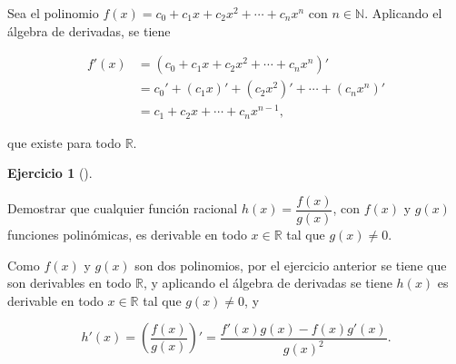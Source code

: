 \documentclass[
  spanish,
  a4paper,
]{scrreport}
\theoremstyle{definition}
\newtheorem{exercise}{Ejercicio}[chapter]
\theoremstyle{remark}
\begin{document}
\begin{tcolorbox}[enhanced jigsaw, arc=.35mm, bottomrule=.15mm, bottomtitle=1mm, breakable, colback=white, colbacktitle=quarto-callout-tip-color!10!white, colframe=quarto-callout-tip-color-frame, coltitle=black, left=2mm, leftrule=.75mm, opacityback=0, opacitybacktitle=0.6, rightrule=.15mm, title=\textcolor{quarto-callout-tip-color}{\faLightbulb}\hspace{0.5em}{Solución}, titlerule=0mm, toprule=.15mm, toptitle=1mm]

Sea el polinomio \(f(x)=c_0+c_1x+c_2x^2+\cdots+c_nx^n\) con
\(n\in\mathbb{N}\). Aplicando el álgebra de derivadas, se tiene

\begin{align*}
f'(x) &= (c_0+c_1x+c_2x^2+\cdots+c_nx^n)' \\ 
&= c_0'+(c_1x)'+(c_2x^2)'+\cdots+(c_nx^n)' \\
&= c_1+c_2x+\cdots+c_nx^{n-1},
\end{align*}

que existe para todo \(\mathbb{R}\).

\end{tcolorbox}

\begin{exercise}[]\protect\hypertarget{exr-derivada-funcion-racional}{}\label{exr-derivada-funcion-racional}

Demostrar que cualquier función racional \(h(x)=\dfrac{f(x)}{g(x)}\),
con \(f(x)\) y \(g(x)\) funciones polinómicas, es derivable en todo
\(x\in\mathbb{R}\) tal que \(g(x)\neq 0\).

\end{exercise}

\begin{tcolorbox}[enhanced jigsaw, arc=.35mm, bottomrule=.15mm, bottomtitle=1mm, breakable, colback=white, colbacktitle=quarto-callout-tip-color!10!white, colframe=quarto-callout-tip-color-frame, coltitle=black, left=2mm, leftrule=.75mm, opacityback=0, opacitybacktitle=0.6, rightrule=.15mm, title=\textcolor{quarto-callout-tip-color}{\faLightbulb}\hspace{0.5em}{Solución}, titlerule=0mm, toprule=.15mm, toptitle=1mm]

Como \(f(x)\) y \(g(x)\) son dos polinomios, por el ejercicio anterior
se tiene que son derivables en todo \(\mathbb{R}\), y aplicando el
álgebra de derivadas se tiene \(h(x)\) es derivable en todo
\(x\in\mathbb{R}\) tal que \(g(x)\neq 0\), y

\[
h'(x) = \left(\frac{f(x)}{g(x)}\right)' = \frac{f'(x)g(x)-f(x)g'(x)}{g(x)^2}.
\]

\end{tcolorbox}
\end{document}
